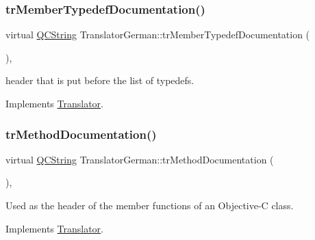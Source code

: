 \mbox{\label{class_translator_german_a8a4a737048fd99fda04bc8abb6512544}} 
\subsubsection{\texorpdfstring{trMemberTypedefDocumentation()}{trMemberTypedefDocumentation()}}
{\footnotesize\ttfamily virtual \mbox{\hyperlink{class_q_c_string}{Q\+C\+String}} Translator\+German\+::tr\+Member\+Typedef\+Documentation (\begin{DoxyParamCaption}{ }\end{DoxyParamCaption})\hspace{0.3cm}{\ttfamily [inline]}, {\ttfamily [virtual]}}

header that is put before the list of typedefs. 

Implements \mbox{\hyperlink{class_translator}{Translator}}.

\mbox{\label{class_translator_german_a34d26545a7d053cefeb7dbb60ec6282d}} 
\subsubsection{\texorpdfstring{trMethodDocumentation()}{trMethodDocumentation()}}
{\footnotesize\ttfamily virtual \mbox{\hyperlink{class_q_c_string}{Q\+C\+String}} Translator\+German\+::tr\+Method\+Documentation (\begin{DoxyParamCaption}{ }\end{DoxyParamCaption})\hspace{0.3cm}{\ttfamily [inline]}, {\ttfamily [virtual]}}

Used as the header of the member functions of an Objective-\/C class. 

Implements \mbox{\hyperlink{class_translator}{Translator}}.

\mbox{\label{class_translator_german_aa4e9a466ac0ad51e393d4d025d572d2f}} 
